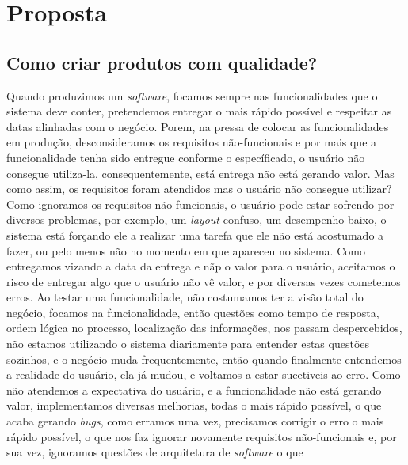 \chapter{Proposta}

  \section{Como criar produtos com qualidade?}
    Quando produzimos um \textit{software}, focamos sempre nas funcionalidades que
    o sistema deve conter, pretendemos entregar o mais rápido possível e respeitar
    as datas alinhadas com o negócio. Porem, na pressa de colocar as funcionalidades
    em produção, desconsideramos os requisitos não-funcionais e por mais que a
    funcionalidade tenha sido entregue conforme o específicado, o usuário não
    consegue utiliza-la, consequentemente, está entrega não está gerando valor. \newline
    Mas como assim, os requisitos foram atendidos mas o usuário não consegue utilizar?
    Como ignoramos os requisitos não-funcionais, o usuário pode estar sofrendo por
    diversos problemas, por exemplo, um \textit{layout} confuso, um desempenho baixo,
    o sistema está forçando ele a realizar uma tarefa que ele não está acostumado a
    fazer, ou pelo menos não no momento em que apareceu no sistema. Como entregamos
    vizando a data da entrega e nãp o valor para o usuário, aceitamos o risco de
    entregar algo que o usuário não vê valor, e por diversas vezes cometemos erros.
    Ao testar uma funcionalidade, não costumamos ter a visão total do negócio,
    focamos na funcionalidade, então questões como tempo de resposta, ordem lógica
    no processo, localização das informações, nos passam despercebidos, não estamos
    utilizando o sistema diariamente para entender estas questões sozinhos, e o
    negócio muda frequentemente, então quando finalmente entendemos a realidade do
    usuário, ela já mudou, e voltamos a estar sucetiveis ao erro. \newline
    Como não atendemos a expectativa do usuário, e a funcionalidade não está gerando
    valor, implementamos diversas melhorias, todas o mais rápido possível, o que
    acaba gerando \textit{bugs}, como erramos uma vez, precisamos corrigir o erro
    o mais rápido possível, o que nos faz ignorar novamente requisitos não-funcionais
    e, por sua vez, ignoramos questões de arquitetura de \textit{software} o que
